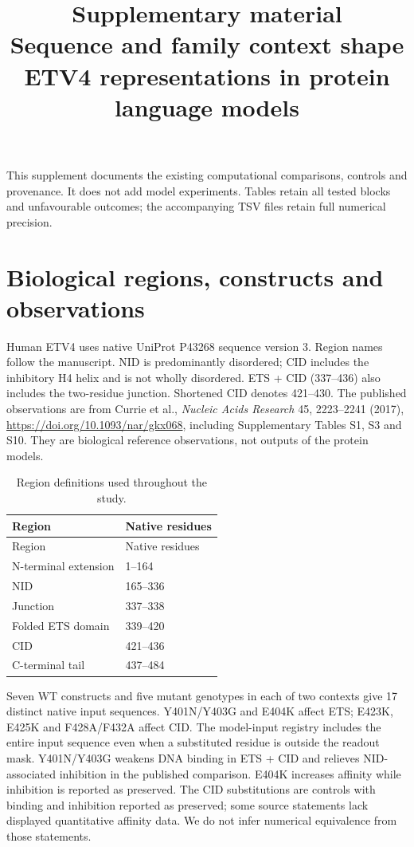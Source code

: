 \documentclass[a4paper,11pt]{scrartcl}
\title{Supplementary material\\\large Sequence and family context shape ETV4 representations in protein language models}
\author{}\date{}
\begin{document}
\maketitle
This supplement documents the existing computational comparisons, controls and provenance. It does not add model experiments. Tables retain all tested blocks and unfavourable outcomes; the accompanying TSV files retain full numerical precision.
\section{Biological regions, constructs and observations}
Human ETV4 uses native UniProt P43268 sequence version 3. Region names follow the manuscript. NID is predominantly disordered; CID includes the inhibitory H4 helix and is not wholly disordered. ETS + CID (337--436) also includes the two-residue junction. Shortened CID denotes 421--430. The published observations are from Currie et al., \emph{Nucleic Acids Research} 45, 2223--2241 (2017), \url{https://doi.org/10.1093/nar/gkx068}, including Supplementary Tables S1, S3 and S10. They are biological reference observations, not outputs of the protein models.

\begingroup\small
\begin{longtable}{@{}ll@{}}
\caption{Region definitions used throughout the study.}\\
\toprule Region & Native residues\\\midrule\endfirsthead
\toprule Region & Native residues\\\midrule\endhead
N-terminal extension & 1--164\\
NID & 165--336\\
Junction & 337--338\\
Folded ETS domain & 339--420\\
CID & 421--436\\
C-terminal tail & 437--484\\
\bottomrule\end{longtable}
\endgroup
Seven WT constructs and five mutant genotypes in each of two contexts give 17 distinct native input sequences. Y401N/Y403G and E404K affect ETS; E423K, E425K and F428A/F432A affect CID. The model-input registry includes the entire input sequence even when a substituted residue is outside the readout mask. Y401N/Y403G weakens DNA binding in ETS + CID and relieves NID-associated inhibition in the published comparison. E404K increases affinity while inhibition is reported as preserved. The CID substitutions are controls with binding and inhibition reported as preserved; some source statements lack displayed quantitative affinity data. We do not infer numerical equivalence from those statements.
\end{document}
